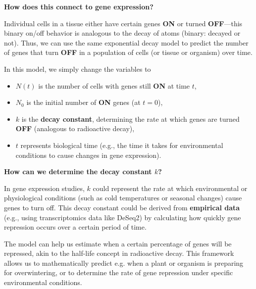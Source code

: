 \documentclass[11pt]{report}
\begin{document}
{	\textbf{How does this connect to gene expression?} 
	
	Individual cells in a tissue either have certain genes \textbf{ON} or turned \textbf{OFF}—this binary on/off behavior is analogous to the decay of atoms (binary: decayed or not). Thus, we can use the same exponential decay model to predict the number of genes that turn \textbf{OFF} in a population of cells (or tissue or organism) over time.
	
	In this model, we simply change the variables to 
	\begin{itemize}
		\item \( N(t) \) is the number of cells with genes still \textbf{ON} at time \( t \),
		\item \( N_0 \) is the initial number of \textbf{ON} genes (at \( t = 0 \)),
		\item \( k \) is the \textbf{decay constant}, determining the rate at which genes are turned \textbf{OFF} (analogous to radioactive decay),
		\item \( t \) represents biological time (e.g., the time it takes for environmental conditions to cause changes in gene expression).
	\end{itemize}
	
	\textbf{How can we determine the decay constant \( k \)?} 
	
	In gene expression studies, \( k \) could represent the rate at which environmental or physiological conditions (such as cold temperatures or seasonal changes) cause genes to turn off. This decay constant could be derived from \textbf{empirical data} (e.g., using transcriptomics data like DeSeq2) by calculating how quickly gene repression occurs over a certain period of time.
	
	The model can help us estimate when a certain percentage of genes will be repressed, akin to the half-life concept in radioactive decay. This framework allows us to mathematically predict e.g. when a plant or organism is preparing for overwintering, or to determine the rate of gene repression under specific environmental conditions.


\newpage	
}
\end{document}
